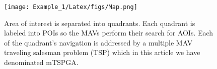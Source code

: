 \documentclass[preprint,review, 11pt,3p,authoryear]{elsarticle}
\newcommand{\rev}{\color{black}} %
\begin{document}
{%

\begin{figure}[!htbp]
\centering
\texttt{[image: Example\_1/Latex/figs/Map.png]}
\caption{Area of interest is separated into quadrants. Each quadrant is labeled into POIs so the MAVs perform their search for AOIs. Each of the quadrant's navigation is addressed by a multiple MAV traveling salesman problem (TSP) which in this article we have denominated mTSPGA.}
\label{fig01}
\end{figure}





\begin{figure}
  \centering


\end{figure}}
\end{document}
